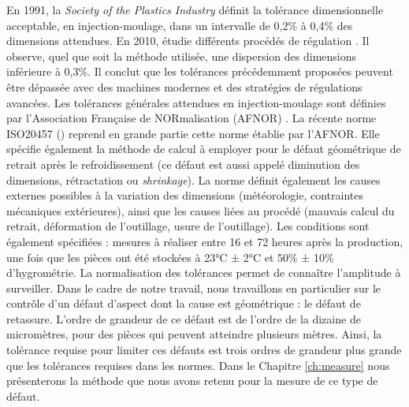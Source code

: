 En 1991, la \textit{Society of the Plastics Industry} \cite{berins_spi_1991} définit la tolérance dimensionnelle acceptable, en injection-moulage, dans un intervalle de 0,2\% à 0,4\% des dimensions attendues.
En 2010, \citeauthor{kazmer_comparison_2010} étudie différents procédés de régulation \cite{kazmer_comparison_2010}. Il observe, quel que soit la méthode utilisée, une dispersion des dimensions inférieure à 0,3\%.
Il conclut que les tolérances précédemment proposées peuvent être dépassée avec des machines modernes et des stratégies de régulations avancées.
Les tolérances générales attendues en injection-moulage sont définies par l’Association Française de NORmalisation (AFNOR) \cite{afnor_nf_1987}.
La récente norme ISO20457 (\cite{ISO_20457_2018}) reprend en grande partie cette norme établie par l'AFNOR.
Elle spécifie également la méthode de calcul à employer pour le défaut géométrique de retrait après le refroidissement (ce défaut est aussi appelé diminution des dimensions, rétractation ou \textit{shrinkage}).
La norme définit également les causes externes possibles à la variation des dimensions (météorologie, contraintes mécaniques extérieures), ainsi que les causes liées au procédé (mauvais calcul du retrait, déformation de l'outillage, usure de l'outillage).
Les conditions sont également spécifiées : mesures à réaliser entre 16 et 72 heures après la production, une fois que les pièces ont été stockées à 23°C ± 2°C et 50\% ± 10\% d'hygrométrie.
La normalisation des tolérances permet de connaître l'amplitude à surveiller.
Dans le cadre de notre travail, nous travaillons en particulier sur le contrôle d'un défaut d'aspect dont la cause est géométrique : le défaut de retassure.
L'ordre de grandeur de ce défaut est de l'ordre de la dizaine de micromètres, pour des pièces qui peuvent atteindre plusieurs mètres.
Ainsi, la tolérance requise pour limiter ces défauts est trois ordres de grandeur plus grande que les tolérances requises dans les normes.
Dans le Chapitre \ref{ch:measure} nous présenterons la méthode que nous avons retenu pour la mesure de ce type de défaut.

